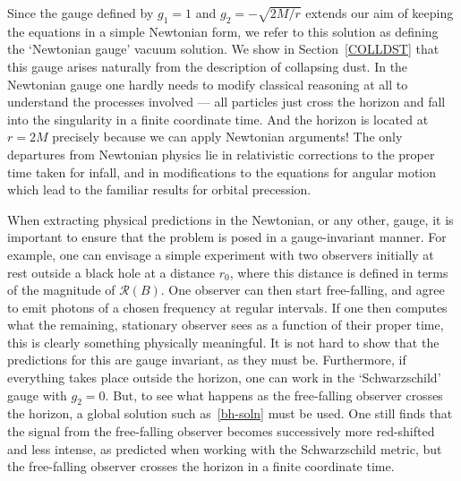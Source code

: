 \documentclass[a4paper]{article}
\numberwithin{equation}{section}
\newcommand{\clr}{{\mathcal{R}}}
\begin{document}
Since the gauge defined by $g_1=1$ and $g_2=-\sqrt{2M/r}$
extends our aim of keeping the equations in a simple Newtonian form,
we refer to this solution as defining the `Newtonian gauge' vacuum
solution.  We show in Section~\ref{COLLDST} that this gauge arises
naturally from the description of collapsing dust.  In the Newtonian
gauge one hardly needs to modify classical reasoning at all to
understand the processes involved --- all particles just cross the
horizon and fall into the singularity in a finite coordinate time.
And the horizon is located at $r=2M$ precisely because we can apply
Newtonian arguments!  The only departures from Newtonian physics lie
in relativistic corrections to the proper time taken for infall, and
in modifications to the equations for angular motion which lead to the
familiar results for orbital precession.


When extracting physical predictions in the Newtonian, or any other,
gauge, it is important to ensure that the problem is posed in a
gauge-invariant manner.  For example, one can envisage a simple
experiment with two observers initially at rest outside a black hole
at a distance $r_0$, where this distance is defined in terms of the
magnitude of $\clr(B)$.  One observer can then start free-falling, and
agree to emit photons of a chosen frequency at regular intervals.  If
one then computes what the remaining, stationary observer sees as a
function of their proper time, this is clearly something physically
meaningful.  It is not hard to show that the predictions for this are
gauge invariant, as they must be.  Furthermore, if everything takes
place outside the horizon, one can work in the `Schwarzschild' gauge
with $g_2=0$.  But, to see what happens as the free-falling observer
crosses the horizon, a global solution such as~\eqref{bh-soln} must
be used.  One still finds that the signal from the free-falling
observer becomes successively more red-shifted and less intense, as
predicted when working with the Schwarzschild metric, but the
free-falling observer crosses the horizon in a finite coordinate time.


\end{document}
